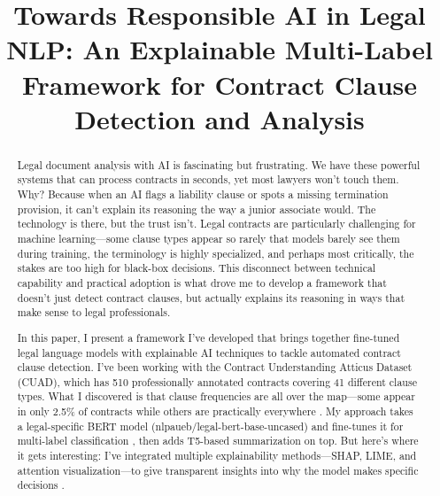\documentclass[conference]{IEEEtran}
\begin{document}
\title{Towards Responsible AI in Legal NLP: An Explainable Multi-Label Framework for Contract Clause Detection and Analysis}

\author{
}

\maketitle

\thispagestyle{plain}
\pagestyle{plain}

\begin{abstract}
Legal document analysis with AI is fascinating but frustrating. We have these powerful systems that can process contracts in seconds, yet most lawyers won't touch them. Why? Because when an AI flags a liability clause or spots a missing termination provision, it can't explain its reasoning the way a junior associate would. The technology is there, but the trust isn't. Legal contracts are particularly challenging for machine learning—some clause types appear so rarely that models barely see them during training, the terminology is highly specialized, and perhaps most critically, the stakes are too high for black-box decisions. This disconnect between technical capability and practical adoption is what drove me to develop a framework that doesn't just detect contract clauses, but actually explains its reasoning in ways that make sense to legal professionals.

In this paper, I present a framework I've developed that brings together fine-tuned legal language models with explainable AI techniques to tackle automated contract clause detection. I've been working with the Contract Understanding Atticus Dataset (CUAD), which has 510 professionally annotated contracts covering 41 different clause types. What I discovered is that clause frequencies are all over the map—some appear in only 2.5\% of contracts while others are practically everywhere \cite{hendrycks2021cuad}. My approach takes a legal-specific BERT model (nlpaueb/legal-bert-base-uncased) and fine-tunes it for multi-label classification \cite{chalkidis2020legal}, then adds T5-based summarization on top. But here's where it gets interesting: I've integrated multiple explainability methods—SHAP, LIME, and attention visualization—to give transparent insights into why the model makes specific decisions \cite{lundberg2017unified}.


\end{abstract}
\end{document}
